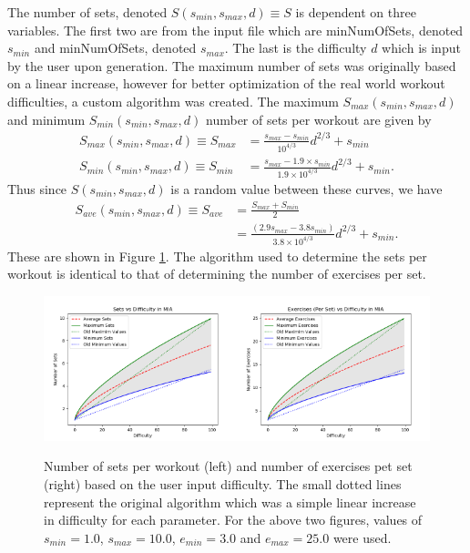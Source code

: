 The number of sets, denoted $S(s_{min},s_{max},d) \equiv S$ is dependent on three variables. The first two are from the input file which are minNumOfSets, denoted $s_{min}$ and minNumOfSets, denoted $s_{max}$. The last is the difficulty $d$ which is input by the user upon generation. The maximum number of sets was originally based on a linear increase, however for better optimization of the real world workout difficulties, a custom algorithm was created. The maximum $S_{max}(s_{min},s_{max},d)$ and minimum $S_{min}(s_{min},s_{max},d)$ number of sets per workout are given by
\begin{align}
S_{max}(s_{min},s_{max},d) \equiv S_{max}&= \frac{s_{max}-s_{min}}{10^{4/3}} d^{2/3}+s_{min} \\
S_{min}(s_{min},s_{max},d) \equiv S_{min}&= \frac{s_{max}-1.9 \times s_{min}}{1.9 \times 10^{4/3}} d^{2/3}+s_{min}.
\end{align}
Thus since $S(s_{min},s_{max},d)$ is a random value between these curves, we have
\begin{align}
S_{ave}(s_{min},s_{max},d) \equiv S_{ave} &= \frac{S_{max}+ S_{min}}{2} \\ &= \frac{\left(2.9s_{max}-3.8s_{min}\right)}{3.8 \times 10^{4/3}}d^{2/3}+s_{min}.
\end{align}
These are shown in Figure \ref{Svd and Evd}. The algorithm used to determine the sets per workout is identical to that of determining the number of exercises per set.

\begin{figure}[h]
	\centering
	\includegraphics[width=0.5\textwidth]{Images/Svd.png}\includegraphics[width=0.5\textwidth]{Images/Evd.png}
	\caption{Number of sets per workout (left) and number of exercises pet set (right) based on the user input difficulty. The small dotted lines represent the original algorithm which was a simple linear increase in difficulty for each parameter. For the above two figures, values of $s_{min}=1.0$, $s_{max} = 10.0$, $e_{min}=3.0$ and $e_{max}=25.0$ were used.} \label{Svd and Evd}
\end{figure}

